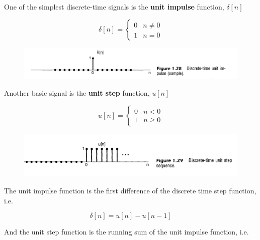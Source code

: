 \documentclass[../notes.tex]{subfiles}
\begin{document}
One of the simplest discrete-time signals is the \textbf{unit impulse} function, $ \delta[n] $ 


\begin{definition}
\begin{equation}
	\delta[n] = \begin{cases}
		0 & n \neq 0 \\
		1 & n = 0
	\end{cases}
	\label{eq:355:unit_impulse}
\end{equation}


\begin{figure}[H]
	\centering
	\includegraphics[width=0.8\linewidth]{img/image_2022-09-16-14-12-45.png}
\end{figure}
\end{definition}


Another basic signal is the \textbf{unit step} function, $ u[n] $

\begin{definition}
	
\begin{equation}
	u[n] = \begin{cases}
		0 & n < 0 \\
		1 & n \geq 0
	\end{cases}
\end{equation}
\begin{figure}[H]
	\centering
	\includegraphics[width=0.8\linewidth]{img/image_2022-09-16-14-13-03.png}
\end{figure}
\end{definition}


The unit impulse function is the first difference of the discrete time step function, i.e.

\begin{equation}
	\delta[n] = u[n] - u[n-1]
\end{equation}

And the unit step function is the running sum of the unit impulse function, i.e.
\end{document}
